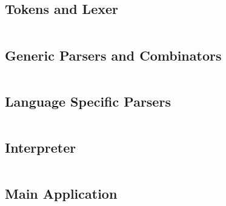 \documentclass[a4paper,9pt]{article}
\newcommand{\hsfile}[1]{\inputminted[breaklines]{haskell}{../haskell/#1.hs}}
\begin{document}
\subsection{Tokens and Lexer}
\hsfile{interpreter/Scanner}
\subsection{Generic Parsers and Combinators}
\hsfile{interpreter/ParserCombis2}
\subsection{Language Specific Parsers}
\hsfile{interpreter/Parser2}
\subsection{Interpreter}
\hsfile{interpreter/Interpreter}
\subsection{Main Application}
\hsfile{interpreter/Main}
\end{document}
